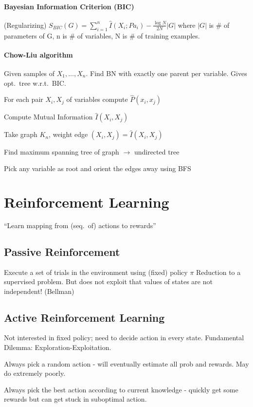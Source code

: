 \documentclass[a4paper, 10pt]{scrartcl}
\begin{document}
\begin{multicols*}{3}
\paragraph{Bayesian Information Criterion (BIC)}
(Regularizing) $S_{BIC}(G) = \sum_{i=1}^{n} \hat{I}(X_i ; Pa_i) - \frac{\log N}{2N} |G|$ where $|G|$ is \# of parameters of G, n is \# of variables, N is \# of training examples.

\paragraph{Chow-Liu algorithm}
Given samples of $X_1,\dots,X_n$.
Find BN with exactly one parent per variable.
Gives opt.\ tree w.r.t.\ BIC.
\begin{compactitem}
	\item For each pair $X_i, X_j$ of variables compute $\hat{P}(x_i, x_j)$
	\item Compute Mutual Information $\hat{I}(X_i, X_j)$
	\item Take graph $K_n$, weight edge $(X_i,X_j) = \hat{I}(X_i, X_j)$
	\item Find maximum spanning tree of graph $\rightarrow$ undirected tree
	\item Pick any variable as root and orient the edges away using BFS
\end{compactitem}

\section{Reinforcement Learning}
``Learn mapping from (seq.\ of) actions to rewards''

\subsection{Passive Reinforcement}
Execute a set of trials in the environment using (fixed) policy  $\pi$
Reduction to a supervised problem. But does not exploit that values of states are not independent! (Bellman)

\subsection{Active Reinforcement Learning}
Not interested in fixed policy; need to decide action in every state. Fundamental Dilemma: Exploration-Exploitation.

\begin{compactitem}
	\item Always pick a random action - will eventually estimate all prob and rewards. May do extremely poorly. 
	\item Always pick the best action according to current knowledge - quickly get some rewards but can get stuck in suboptimal action.
\end{compactitem}


\end{multicols*}
\end{document}
